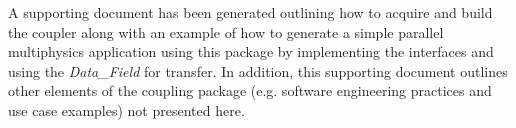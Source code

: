 \documentclass[letterpaper]{article}
\begin{document}
A supporting document has been generated outlining how to acquire and
build the coupler along with an example of how to generate a simple
parallel multiphysics application using this package by implementing
the interfaces and using the {\sl Data\_Field} for transfer. In
addition, this supporting document outlines other elements of the
coupling package (e.g. software engineering practices and use case
examples) not presented here.

\pagebreak


\end{document}

